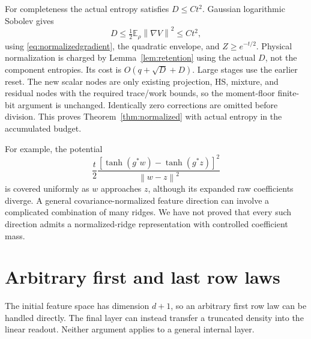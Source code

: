 \documentclass[11pt]{article}
\newcommand{\E}{\mathbb E}
\newcommand{\norm}[1]{\left\lVert #1\right\rVert}
\begin{document}
For completeness the actual entropy satisfies $D\le Ct^2$. Gaussian logarithmic Sobolev gives
\[
 D\le\tfrac12\E_\rho\norm{\nabla V}^2\le Ct^2,
\]
using \eqref{eq:normalizedgradient}, the quadratic envelope, and $Z\ge e^{-t/2}$. Physical normalization is charged by Lemma~\ref{lem:retention} using the actual $D$, not the component entropies. Its cost is $O(q+\sqrt D+D)$. Large stages use the earlier reset. The new scalar nodes are only existing projection, HS, mixture, and residual nodes with the required trace/work bounds, so the moment-floor finite-bit argument is unchanged. Identically zero corrections are omitted before division. This proves Theorem~\ref{thm:normalized} with actual entropy in the accumulated budget.

For example, the potential
\[
 \frac t2\frac{[\tanh(g^*w)-\tanh(g^*z)]^2}{\norm{w-z}^2}
\]
is covered uniformly as $w$ approaches $z$, although its expanded raw coefficients diverge. A general covariance-normalized feature direction can involve a complicated combination of many ridges. We have not proved that every such direction admits a normalized-ridge representation with controlled coefficient mass.

\section{Arbitrary first and last row laws}
\label{sec:endpoints}
The initial feature space has dimension $d+1$, so an arbitrary first row law can be handled directly. The final layer can instead transfer a truncated density into the linear readout. Neither argument applies to a general internal layer.
\end{document}
